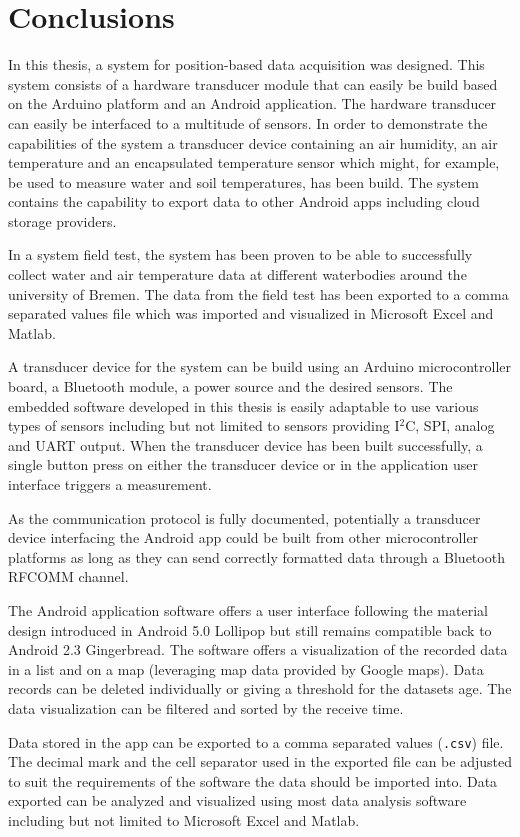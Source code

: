 \chapter{Conclusions}
In this thesis, a system for position-based data acquisition was designed. This system consists of a hardware transducer module that can easily be build based on the Arduino platform and an Android application. The hardware transducer can easily be interfaced to a multitude of sensors. In order to demonstrate the capabilities of the system a transducer device containing an air humidity, an air temperature and an encapsulated temperature sensor which might, for example, be used to measure water and soil temperatures, has been build. The system contains the capability to export data to other Android apps including cloud storage providers. 

In a system field test, the system has been proven to be able to successfully collect water and air temperature data at different waterbodies around the university of Bremen. The data from the field test has been exported to a comma separated values file which was imported and visualized in Microsoft Excel and Matlab.

A transducer device for the system can be build using an Arduino microcontroller board, a Bluetooth module, a power source and the desired sensors. The embedded software developed in this thesis is easily adaptable to use various types of sensors including but not limited to sensors providing I$^2$C, SPI, analog and UART output. When the transducer device has been built successfully, a single button press on either the transducer device or in the application user interface triggers a measurement.

As the communication protocol is fully documented, potentially a transducer device interfacing the Android app could be built from other microcontroller platforms as long as they can send correctly formatted data through a Bluetooth RFCOMM channel.

The Android application software offers a user interface following the material design introduced in Android 5.0 Lollipop but still remains compatible back to Android 2.3 Gingerbread. The software offers a visualization of the recorded data in a list and on a map (leveraging map data provided by Google maps). Data records can be deleted individually or giving a threshold for the datasets age. The data visualization can be filtered and sorted by the receive time.

Data stored in the app can be exported to a comma separated values (\texttt{.csv}) file. The decimal mark and the cell separator used in the exported file can be adjusted to suit the requirements of the software the data should be imported into. Data exported can be analyzed and visualized using most data analysis software including but not limited to Microsoft Excel and Matlab. 